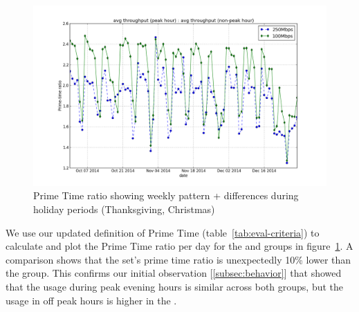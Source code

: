 \begin{figure}[t]
\begin{minipage}{\linewidth}
\centering
\includegraphics[width=\linewidth]{figures/prime-time-ratio-by-date[replace].png}
\caption{Prime Time ratio showing weekly pattern + differences during holiday periods (Thanksgiving, Christmas)}
\label{fig:TS-prime-time-ratio}
\end{minipage}
\end{figure}

We use our updated definition of Prime Time (table~\ref{tab:eval-criteria}) to calculate and plot
the Prime Time ratio per day for the \treatment{} and \control{} groups in
figure~\ref{fig:TS-prime-time-ratio}. A comparison shows that
the \treatment{} set's prime time ratio is unexpectedly 10\% lower than the 
\control{} group. 
This confirms our initial observation [\autoref{subsec:behavior}] that showed 
that the usage during peak evening hours is similar
across both groups, but the usage in off peak hours is higher in the \treatment{}.